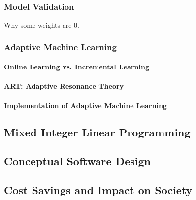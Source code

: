 \subsubsection{Model Validation}
Why some weights are 0.

\subsubsection{Adaptive Machine Learning}
\paragraph{Online Learning vs. Incremental Learning}
\paragraph{ART: Adaptive Resonance Theory}
\paragraph{Implementation of Adaptive Machine Learning}

\subsection{Mixed Integer Linear Programming}
\subsection{Conceptual Software Design}
\subsection{Cost Savings and Impact on Society}
